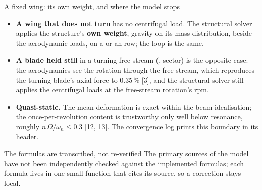 \begin{frame}{A fixed wing: its own weight, and where the model stops}
\begin{itemize}\small
  \item \textbf{A wing that does not turn} has no centrifugal load. The
        structural solver applies the structure's \textbf{own weight}, gravity
        on its mass distribution, beside the aerodynamic loads, on a
         or an  row; the loop is the same.
  \item \textbf{A blade held still} in a turning free stream
        (, sector) is the opposite case: the aerodynamics
        see the rotation through the free stream, which reproduces the
        turning blade's axial force to 0.35\,\% [3], and the structural solver
        still applies the centrifugal loads at the free-stream rotation's rpm.
  \item \textbf{Quasi-static.} The mean deformation is exact within the beam
        idealisation; the once-per-revolution content is trustworthy only well
        below resonance, roughly \(n\,\Omega / \omega_n \le 0.3\) [12, 13].
        The convergence log prints this boundary in its header.
\end{itemize}
\begin{alertblock}{The formulas are transcribed, not re-verified}
\small The primary sources of the model have not been independently checked
against the implemented formulas; each formula lives in one small function
that cites its source, so a correction stays local.
\end{alertblock}
\end{frame}

